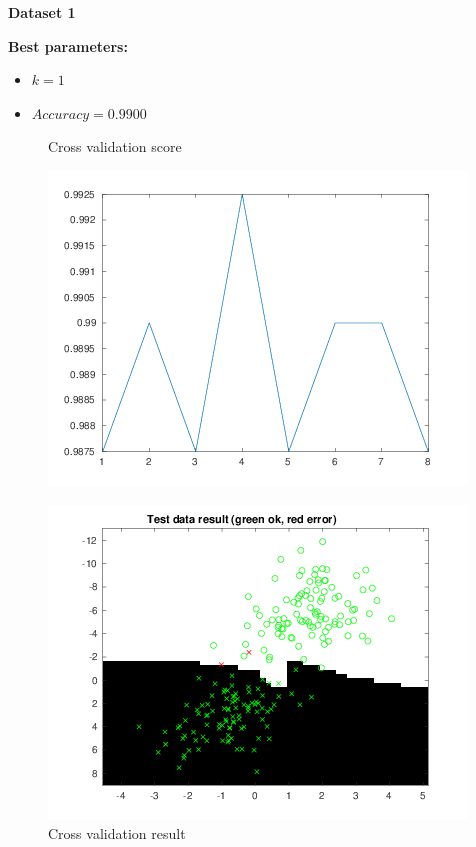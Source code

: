 \documentclass[a4paper,12pt]{article}
\begin{document}
\noindent \textbf{Dataset 1}

\textbf{Best parameters:}
\begin{itemize}
\item $k = 1$
\item $Accuracy = 0.9900$
\end{itemize}

\begin{figure}[H]
\centering
  \begin{minipage}[]{0.49\textwidth}
  \caption{Cross validation score}\label{fig:kNN-1-cv-score}
  \includegraphics[width=\textwidth]{figures/kNN_1_cv_score.png}
  \end{minipage}
  \begin{minipage}[]{0.49\textwidth}
  \caption{Cross validation result}\label{fig:kNN-1-cv}
  \includegraphics[width=\textwidth]{figures/kNN_1_cv.png}
  \end{minipage}
\end{figure}
\end{document}
